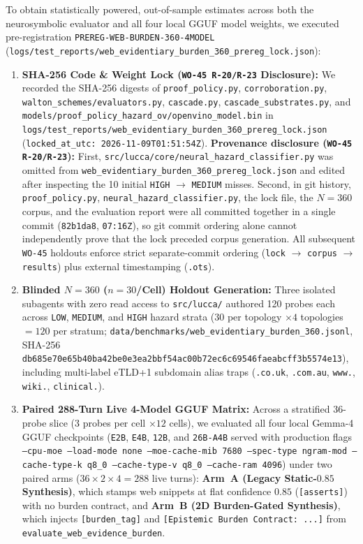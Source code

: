 \documentclass[11pt,a4paper]{article}
\begin{document}
To obtain statistically powered, out-of-sample estimates across both the neurosymbolic evaluator and all four local GGUF model weights, we executed pre-registration \texttt{PREREG-WEB-BURDEN-360-4MODEL} (\texttt{logs/test\_reports/web\_evidentiary\_burden\_360\_prereg\_lock.json}):
\begin{enumerate}
    \item \textbf{SHA-256 Code \& Weight Lock (\texttt{WO-45 R-20/R-23} Disclosure):} We recorded the SHA-256 digests of \texttt{proof\_policy.py}, \texttt{corroboration.py}, \texttt{walton\_schemes/evaluators.py}, \texttt{cascade.py}, \texttt{cascade\_substrates.py}, and \texttt{models/proof\_policy\_hazard\_ov/openvino\_model.bin} in \texttt{logs/test\_reports/web\_evidentiary\_burden\_360\_prereg\_lock.json} (\texttt{locked\_at\_utc: 2026-11-09T01:51:54Z}). \textbf{Provenance disclosure (\texttt{WO-45 R-20/R-23}):} First, \texttt{src/lucca/core/neural\_hazard\_classifier.py} was omitted from \texttt{web\_evidentiary\_burden\_360\_prereg\_lock.json} and edited after inspecting the 10 initial \texttt{HIGH} $\rightarrow$ \texttt{MEDIUM} misses. Second, in git history, \texttt{proof\_policy.py}, \texttt{neural\_hazard\_classifier.py}, the lock file, the $N=360$ corpus, and the evaluation report were all committed together in a single commit (\texttt{82b1da8}, \texttt{07:16Z}), so git commit ordering alone cannot independently prove that the lock preceded corpus generation. All subsequent \texttt{WO-45} holdouts enforce strict separate-commit ordering (\texttt{lock} $\rightarrow$ \texttt{corpus} $\rightarrow$ \texttt{results}) plus external timestamping (\texttt{.ots}).
    \item \textbf{Blinded $N=360$ ($n=30$/Cell) Holdout Generation:} Three isolated subagents with zero read access to \texttt{src/lucca/} authored 120 probes each across \texttt{LOW}, \texttt{MEDIUM}, and \texttt{HIGH} hazard strata ($30$ per topology $\times 4$ topologies $= 120$ per stratum; \texttt{data/benchmarks/web\_evidentiary\_burden\_360.jsonl}, SHA-256 \texttt{db685e70e65b40ba42be0e3ea2bbf54ac00b72ec6c69546faeabcff3b5574e13}), including multi-label eTLD+1 subdomain alias traps (\texttt{.co.uk}, \texttt{.com.au}, \texttt{www.}, \texttt{wiki.}, \texttt{clinical.}).
    \item \textbf{Paired 288-Turn Live 4-Model GGUF Matrix:} Across a stratified 36-probe slice ($3$ probes per cell $\times 12$ cells), we evaluated all four local Gemma-4 GGUF checkpoints (\texttt{E2B}, \texttt{E4B}, \texttt{12B}, and \texttt{26B-A4B} served with production flags \texttt{--cpu-moe --load-mode none --moe-cache-mib 7680 --spec-type ngram-mod --cache-type-k q8\_0 --cache-type-v q8\_0 --cache-ram 4096}) under two paired arms ($36 \times 2 \times 4 = 288$ live turns): \textbf{Arm~A (Legacy Static-$0.85$ Synthesis)}, which stamps web snippets at flat confidence $0.85$ (\texttt{[asserts]}) with no burden contract, and \textbf{Arm~B (2D Burden-Gated Synthesis)}, which injects \texttt{[{burden\_tag}]} and \texttt{[Epistemic Burden Contract: ...]} from \texttt{evaluate\_web\_evidence\_burden}.
\end{enumerate}
\end{document}
